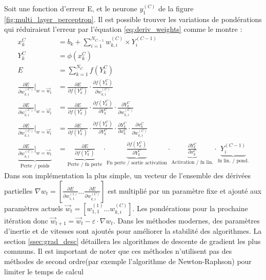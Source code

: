       Soit une fonction d'erreur E, et le neurone $ y^{(C)}_1 $ de la figure \ref{fig:multi_layer_perceptron}. Il est possible trouver les variations de pondérations qui réduiraient l'erreur par l'équation \ref{eq:deriv_weights} comme le montre \textcite{rumelhart_learning_1986}:
      \begin{align}
        x^{C}_k &= b_k + \sum_{i=1}^{N_{C-1}} w^{(C)}_{k,i} \times Y^{(C-1)}_i\\
        Y^{C}_k &= \phi(x^{C}_k)\\
        E &= \sum^{N_C}_{k=1} f(Y^{C}_k)\\
        \frac{\partial{E}}{\partial{w^{(C)}_{k,i}}}\bigg|_{w=\overrightarrow{w}_{t}} &= \frac{\partial{E}}{\partial{f(Y^{C}_k)}} \cdot \frac{\partial{f(Y^{C}_k)}}{\partial{w^{(C)}_{k,i}}}\\
        \frac{\partial{E}}{\partial{w^{(C)}_{k,i}}}\bigg|_{w=\overrightarrow{w}_{t}} &= \frac{\partial{E}}{\partial{f(Y^{C}_k)}} \cdot \frac{\partial{f(Y^{C}_k)}}{\partial{Y^{C}_k}} \cdot \frac{\partial{Y^{C}_k}}{\partial{w^{(C)}_{k,i}}} \\
        \frac{\partial{E}}{\partial{w^{(C)}_{k,i}}}\bigg|_{w=\overrightarrow{w}_{t}} &= \frac{\partial{E}}{\partial{f(Y^{C}_k)}} \cdot \frac{\partial{f(Y^{C}_k)}}{\partial{Y^{C}_k}} \cdot \frac{\partial{Y^{C}_k}}{\partial{x^{C}_k}} \cdot \frac{\partial{x^{C}_k}}{\partial{w^{(C)}_{k,i}}}\\
        \underbrace{\frac{\partial{E}}{\partial{w^{(C)}_{k,i}}}\bigg|_{w=\overrightarrow{w}_{t}}}_\text{Perte / poids} &= \underbrace{\frac{\partial{E}}{\partial{f(Y^{C}_k)}}}_\text{Perte / fn perte} \cdot \underbrace{\frac{\partial{f(Y^{C}_k)}}{\partial{Y^{C}_k}}}_\text{Fn perte / sortie activation} \cdot \underbrace{\frac{\partial{Y^{C}_k}}{\partial{x^{C}_k}}}_\text{Activation / fn lin.} \cdot \underbrace{Y^{(C-1)}_i}_\text{fn lin. / pond.}\label{eq:deriv_weights}
      \end{align}
    Dans son implémentation la plus simple, un vecteur de l'ensemble des dérivées partielles $\nabla{w_{t}} = \left[ \frac{\partial{E}}{\partial{w^{(1)}_{1,1}}} \ldots \frac{\partial{E}}{\partial{w^{(C)}_{k,i}}} \right] $ est multiplié par un paramètre fixe et ajouté aux paramètres actuels $\overrightarrow{w}_{t} = \left[w^{(1)}_{1,1} \ldots w^{(C)}_{k,i}  \right] $. Les pondérations pour la prochaine itération donc $\overrightarrow{w}_{t+1} = \overrightarrow{w}_{t} - \varepsilon \cdot \nabla{w_{t}} $. Dans les méthodes modernes, des paramètres d'inertie et de vitesses sont ajoutés pour améliorer la stabilité des algorithmes. La section \ref{ssec:grad_desc} détaillera les algorithmes de descente de gradient les plus communs. Il est important de noter que ces méthodes n'utilisent pas des méthodes de second ordre(par exemple l'algorithme de Newton-Raphson) pour limiter le temps de calcul 
